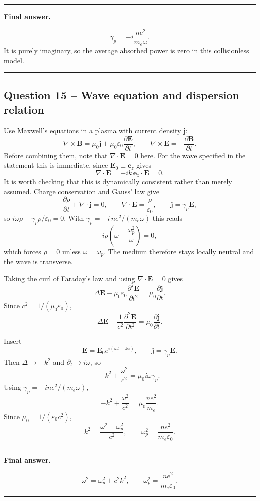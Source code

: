 \documentclass[11pt,a4paper]{article}
\newenvironment{finalanswer}{%
  \begin{center}\begin{minipage}{0.94\linewidth}\hrule\vspace{0.45em}\textbf{Final answer. }%
}{%
  \vspace{0.45em}\hrule\end{minipage}\end{center}%
}
\newcommand{\E}{\mathbf{E}}
\newcommand{\B}{\mathbf{B}}
\newcommand{\jv}{\mathbf{j}}
\begin{document}
\begin{finalanswer}
\[
\gamma_p=-i\frac{n e^2}{m_e\omega}.
\]
It is purely imaginary, so the average absorbed power is zero in this collisionless model.
\end{finalanswer}

\subsection*{Question 15 -- Wave equation and dispersion relation}

Use Maxwell's equations in a plasma with current density $\jv$:
\[
 \nabla\times\B=\mu_0\jv+\mu_0\varepsilon_0\frac{\partial\E}{\partial t},
 \qquad
 \nabla\times\E=-\frac{\partial\B}{\partial t}.
\]
Before combining them, note that $\nabla\cdot\E=0$ here. For the wave specified in
the statement this is immediate, since $\E_0\perp\mathbf e_z$ gives
\[
 \nabla\cdot\E=-ik\,\mathbf e_z\cdot\E=0 .
\]
It is worth checking that this is dynamically consistent rather than merely
assumed. Charge conservation and Gauss' law give
\[
 \frac{\partial\rho}{\partial t}+\nabla\cdot\jv=0,
 \qquad
 \nabla\cdot\E=\frac{\rho}{\varepsilon_0},
 \qquad
 \jv=\gamma_p\E,
\]
so $i\omega\rho+\gamma_p\rho/\varepsilon_0=0$. With
$\gamma_p=-i\,ne^2/(m_e\omega)$ this reads
\[
 i\rho\left(\omega-\frac{\omega_p^2}{\omega}\right)=0,
\]
which forces $\rho=0$ unless $\omega=\omega_p$. The medium therefore stays
locally neutral and the wave is transverse.

Taking the curl of Faraday's law and using $\nabla\cdot\E=0$ gives
\[
 \Delta\E-\mu_0\varepsilon_0\frac{\partial^2\E}{\partial t^2}
 =\mu_0\frac{\partial\jv}{\partial t}.
\]
Since $c^2=1/(\mu_0\varepsilon_0)$,
\[
 \Delta\E-\frac{1}{c^2}\frac{\partial^2\E}{\partial t^2}
 =\mu_0\frac{\partial\jv}{\partial t}.
\]

Insert
\[
 \E=\E_0e^{i(\omega t-kz)},\qquad \jv=\gamma_p\E.
\]
Then $\Delta\to -k^2$ and $\partial_t\to i\omega$, so
\[
 -k^2+\frac{\omega^2}{c^2}=\mu_0 i\omega\gamma_p.
\]
Using $\gamma_p=-i n e^2/(m_e\omega)$,
\[
 -k^2+\frac{\omega^2}{c^2}=\mu_0\frac{n e^2}{m_e}.
\]
Since $\mu_0=1/(\varepsilon_0c^2)$,
\[
 k^2=\frac{\omega^2-\omega_p^2}{c^2},
 \qquad
 \omega_p^2=\frac{n e^2}{m_e\varepsilon_0}.
\]

\begin{finalanswer}
\[
\omega^2=\omega_p^2+c^2k^2,
\qquad
\omega_p^2=\frac{n e^2}{m_e\varepsilon_0}.
\]
\end{finalanswer}
\end{document}

